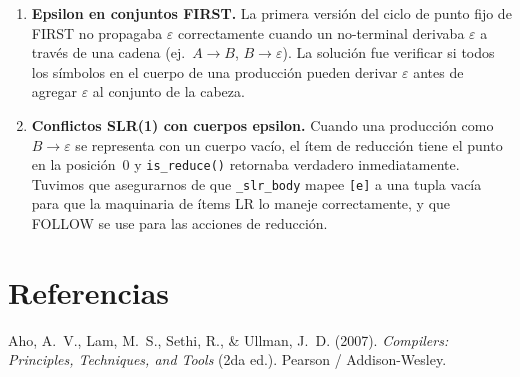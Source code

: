 \documentclass[11pt,a4paper]{article}
\begin{document}
\begin{enumerate}
  \item \textbf{Epsilon en conjuntos FIRST.}
    La primera versi\'on del ciclo de punto fijo de FIRST no propagaba $\varepsilon$ correctamente cuando un no-terminal derivaba $\varepsilon$ a trav\'es de una cadena (ej.\ $A \to B$, $B \to \varepsilon$).
    La soluci\'on fue verificar si todos los s\'imbolos en el cuerpo de una producci\'on pueden derivar $\varepsilon$ antes de agregar $\varepsilon$ al conjunto de la cabeza.

  \item \textbf{Conflictos SLR(1) con cuerpos epsilon.}
    Cuando una producci\'on como $B \to \varepsilon$ se representa con un cuerpo vac\'io, el \'item de reducci\'on tiene el punto en la posici\'on~0 y \texttt{is\_reduce()} retornaba verdadero inmediatamente.
    Tuvimos que asegurarnos de que \texttt{\_slr\_body} mapee \texttt{[e]} a una tupla vac\'ia para que la maquinaria de \'items LR lo maneje correctamente, y que FOLLOW se use para las acciones de reducci\'on.
\end{enumerate}


\section*{Referencias}

Aho, A.~V., Lam, M.~S., Sethi, R., \& Ullman, J.~D. (2007).
\emph{Compilers: Principles, Techniques, and Tools} (2da ed.).
Pearson / Addison-Wesley.
\end{document}
